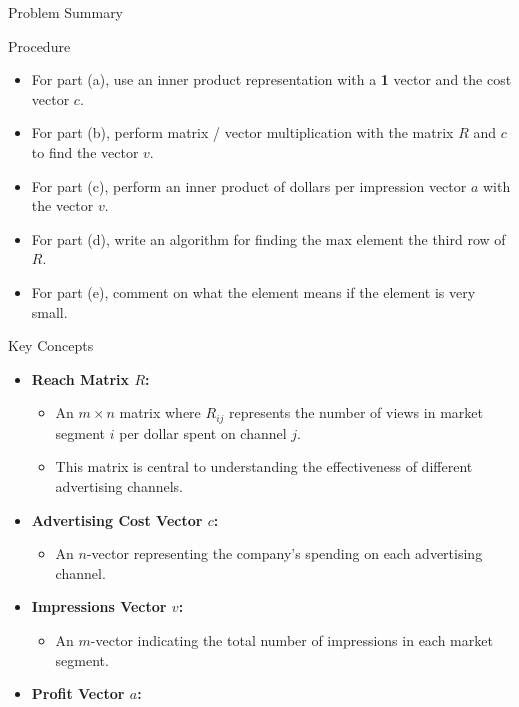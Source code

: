 \begin{summary}{Problem Summary}
    \begin{statement}{Procedure}
        \begin{itemize}
            \item For part (a), use an inner product representation with a \textbf{1} vector and the cost vector $c$.
            \item For part (b), perform matrix / vector multiplication with the matrix $R$ and $c$ to find the vector $v$.
            \item For part (c), perform an inner product of dollars per impression vector $a$ with the vector $v$.
            \item For part (d), write an algorithm for finding the max element the third row of $R$.
            \item For part (e), comment on what the element means if the element is very small.
        \end{itemize}
    \end{statement}
    \begin{statement}{Key Concepts}
        \begin{itemize}
            \item \textbf{Reach Matrix $R$:}
            \begin{itemize}
                \item An $m \times n$ matrix where $R_{ij}$ represents the number of views in market segment $i$ per dollar spent on channel $j$.
                \item This matrix is central to understanding the effectiveness of different advertising channels.
            \end{itemize}
            \item \textbf{Advertising Cost Vector $c$:}
            \begin{itemize}
                \item An $n$-vector representing the company's spending on each advertising channel.
            \end{itemize}
            \item \textbf{Impressions Vector $v$:}
            \begin{itemize}
                \item An $m$-vector indicating the total number of impressions in each market segment.
            \end{itemize}
            \item \textbf{Profit Vector $a$:}

\end{itemize}
\end{statement}
\end{summary}
